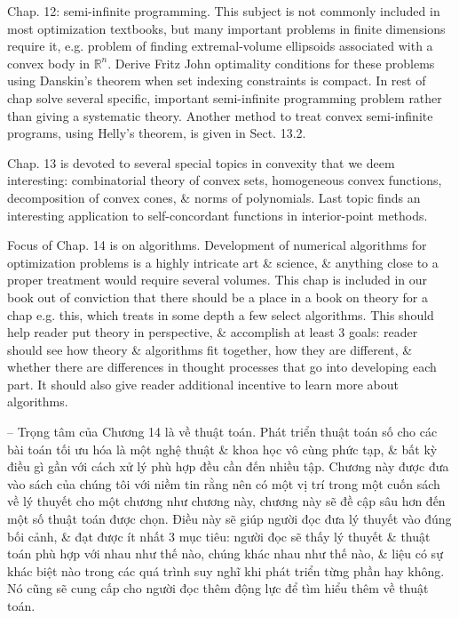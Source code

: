 \documentclass{article}
\begin{document}
\begin{itemize}
    Chap. 12: semi-infinite programming. This subject is not commonly included in most optimization textbooks, but many important problems in finite dimensions require it, e.g. problem of finding extremal-volume ellipsoids associated with a convex body in $\mathbb{R}^n$. Derive Fritz John optimality conditions for these problems using Danskin's theorem when set indexing constraints is compact. In rest of chap solve several specific, important semi-infinite programming problem rather than giving a systematic theory. Another method to treat convex semi-infinite programs, using Helly's theorem, is given in Sect. 13.2.
    
    Chap. 13 is devoted to several special topics in convexity that we deem interesting: combinatorial theory of convex sets, homogeneous convex functions, decomposition of convex cones, \& norms of polynomials. Last topic finds an interesting application to self-concordant functions in interior-point methods.
    
    Focus of Chap. 14 is on algorithms. Development of numerical algorithms for optimization problems is a highly intricate art \& science, \& anything close to a proper treatment would require several volumes. This chap is included in our book out of conviction that there should be a place in a book on theory for a chap e.g. this, which treats in some depth a few select algorithms. This should help reader put theory in perspective, \& accomplish at least 3 goals: reader should see how theory \& algorithms fit together, how they are different, \& whether there are differences in thought processes that go into developing each part. It should also give reader additional incentive to learn more about algorithms.
    
    -- Trọng tâm của Chương 14 là về thuật toán. Phát triển thuật toán số cho các bài toán tối ưu hóa là một nghệ thuật \& khoa học vô cùng phức tạp, \& bất kỳ điều gì gần với cách xử lý phù hợp đều cần đến nhiều tập. Chương này được đưa vào sách của chúng tôi với niềm tin rằng nên có một vị trí trong một cuốn sách về lý thuyết cho một chương như chương này, chương này sẽ đề cập sâu hơn đến một số thuật toán được chọn. Điều này sẽ giúp người đọc đưa lý thuyết vào đúng bối cảnh, \& đạt được ít nhất 3 mục tiêu: người đọc sẽ thấy lý thuyết \& thuật toán phù hợp với nhau như thế nào, chúng khác nhau như thế nào, \& liệu có sự khác biệt nào trong các quá trình suy nghĩ khi phát triển từng phần hay không. Nó cũng sẽ cung cấp cho người đọc thêm động lực để tìm hiểu thêm về thuật toán.
    

\end{itemize}
\end{document}

